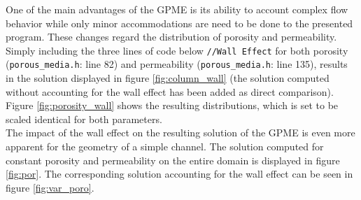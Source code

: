 \documentclass{article}
\begin{document}
One of the main advantages of the GPME is its ability to account complex flow behavior while only minor accommodations are need to be done to the presented program. These changes regard the distribution of porosity and permeability. Simply including the three lines of code below \lstinline{//Wall Effect} for both porosity (\texttt{porous\_media.h}: line 82) and permeability (\texttt{porous\_media.h}: line 135), results in the solution displayed in figure \ref{fig:column_wall} (the solution computed without accounting for the wall effect has been added as direct comparison). Figure \ref{fig:porosity_wall} shows the resulting distributions, which is set to be scaled identical for both parameters.\\
The impact of the wall effect on the resulting solution of the GPME is even more apparent for the geometry of a simple channel. The solution computed for constant porosity and permeability on the entire domain is displayed in figure \ref{fig:por}. The corresponding solution accounting for the wall effect can be seen in figure \ref{fig:var_poro}.
\end{document}
